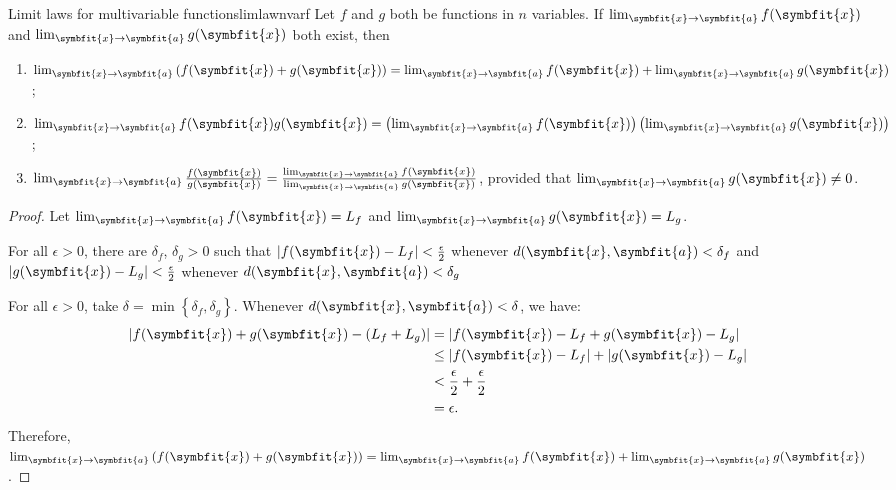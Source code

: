\documentclass[math]{amznotes}
\theoremstyle{remark}
\begin{document}
\begin{thmbox}{Limit laws for multivariable functions}{limlawnvarf}
    Let $f$ and $g$ both be functions in $n$ variables. If $\lim_{\symbfit{x} \to \symbfit{a}} f(\symbfit{x})$ and $\lim_{\symbfit{x} \to \symbfit{a}} g(\symbfit{x})$ both exist, then
    \begin{enumerate}
        \item $\lim_{\symbfit{x} \to \symbfit{a}} \left(f(\symbfit{x}) + g(\symbfit{x})\right) = \lim_{\symbfit{x} \to \symbfit{a}} f(\symbfit{x}) + \lim_{\symbfit{x} \to \symbfit{a}} g(\symbfit{x})$;
        \item $\lim_{\symbfit{x} \to \symbfit{a}} f(\symbfit{x})g(\symbfit{x}) = \left(\lim_{\symbfit{x} \to \symbfit{a}} f(\symbfit{x})\right)\left(\lim_{\symbfit{x} \to \symbfit{a}} g(\symbfit{x})\right)$;
        \item $\lim_{\symbfit{x} \to \symbfit{a}} \frac{f(\symbfit{x})}{g(\symbfit{x})} = \frac{\lim_{\symbfit{x} \to \symbfit{a}} f(\symbfit{x})}{\lim_{\symbfit{x} \to \symbfit{a}} g(\symbfit{x})}$, provided that $\lim_{\symbfit{x} \to \symbfit{a}} g(\symbfit{x}) \neq 0$.
    \end{enumerate}
    \tcblower
    \begin{proof}
        Let $\lim_{\symbfit{x} \to \symbfit{a}} f(\symbfit{x}) = L_f$ and $\lim_{\symbfit{x} \to \symbfit{a}} g(\symbfit{x}) = L_g$.

        For all $\epsilon > 0$, there are $\delta_f$, $\delta_g > 0$ such that $\left|f(\symbfit{x}) - L_f\right| <  \frac{\epsilon}{2}$ whenever $d(\symbfit{x}, \symbfit{a}) < \delta_f$ and $\left|g(\symbfit{x}) - L_g\right| < \frac{\epsilon}{2}$ whenever $d(\symbfit{x}, \symbfit{a}) < \delta_g$

        For all $\epsilon > 0$, take $\delta = \min \left\{\delta_f, \delta_g\right\}$. Whenever $d(\symbfit{x}, \symbfit{a}) < \delta$, we have:
        \begin{align*}
            \left|f(\symbfit{x}) + g(\symbfit{x}) - \left(L_f + L_g\right)\right| & = \left|f(\symbfit{x}) - L_f + g(\symbfit{x}) - L_g\right|                 \\
                                                                                  & \leq \left|f(\symbfit{x}) - L_f\right| + \left|g(\symbfit{x}) - L_g\right| \\
                                                                                  & < \frac{\epsilon}{2} + \frac{\epsilon}{2}                                  \\
                                                                                  & = \epsilon.
        \end{align*}
        Therefore, $\lim_{\symbfit{x} \to \symbfit{a}} \left(f(\symbfit{x}) + g(\symbfit{x})\right) = \lim_{\symbfit{x} \to \symbfit{a}} f(\symbfit{x}) + \lim_{\symbfit{x} \to \symbfit{a}} g(\symbfit{x})$.


\end{proof}
\end{thmbox}
\end{document}
